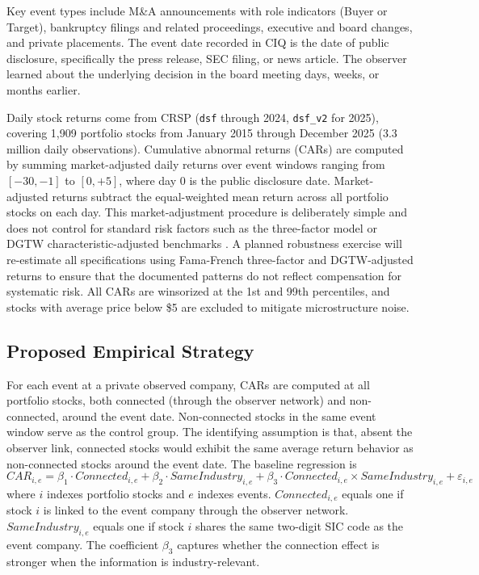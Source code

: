 Key event types include M\&A announcements with role indicators (Buyer or Target), bankruptcy filings and related proceedings, executive and board changes, and private placements. The event date recorded in CIQ is the date of public disclosure, specifically the press release, SEC filing, or news article. The observer learned about the underlying decision in the board meeting days, weeks, or months earlier.

Daily stock returns come from CRSP (\texttt{dsf} through 2024, \texttt{dsf\_v2} for 2025), covering 1,909 portfolio stocks from January 2015 through December 2025 (3.3 million daily observations). Cumulative abnormal returns (CARs) are computed by summing market-adjusted daily returns over event windows ranging from $[-30,-1]$ to $[0,+5]$, where day 0 is the public disclosure date. Market-adjusted returns subtract the equal-weighted mean return across all portfolio stocks on each day. This market-adjustment procedure is deliberately simple and does not control for standard risk factors such as the  three-factor model or DGTW characteristic-adjusted benchmarks \cite{daniel1997measuring}. A planned robustness exercise will re-estimate all specifications using Fama-French three-factor and DGTW-adjusted returns to ensure that the documented patterns do not reflect compensation for systematic risk. All CARs are winsorized at the 1st and 99th percentiles, and stocks with average price below \$5 are excluded to mitigate microstructure noise.

\subsection{Proposed Empirical Strategy}

For each event at a private observed company, CARs are computed at all portfolio stocks, both connected (through the observer network) and non-connected, around the event date. Non-connected stocks in the same event window serve as the control group. The identifying assumption is that, absent the observer link, connected stocks would exhibit the same average return behavior as non-connected stocks around the event date. The baseline regression is
\begin{equation}
\label{eq:baseline}
CAR_{i,e} = \beta_1 \cdot Connected_{i,e} + \beta_2 \cdot SameIndustry_{i,e} + \beta_3 \cdot Connected_{i,e} \times SameIndustry_{i,e} + \varepsilon_{i,e}
\end{equation}
where $i$ indexes portfolio stocks and $e$ indexes events. $Connected_{i,e}$ equals one if stock $i$ is linked to the event company through the observer network. $SameIndustry_{i,e}$ equals one if stock $i$ shares the same two-digit SIC code as the event company. The coefficient $\beta_3$ captures whether the connection effect is stronger when the information is industry-relevant.

